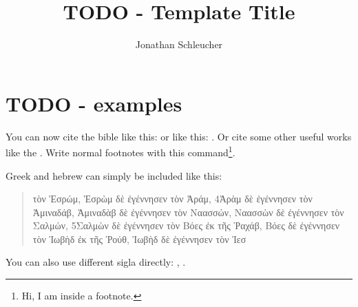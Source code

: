 \documentclass[12pt]{article}
\title{TODO - Template Title}
\date{}
\author{Jonathan Schleucher}
\begin{document}
{\let\newpage\relax\maketitle}

\section{TODO - examples}
You can now cite the bible like this:  or like this: .
Or cite some other useful works like the \Cite{bhs}.
Write normal footnotes with this command\footnote{Hi, I am inside a footnote.}.

Greek and hebrew can simply be included like this:
\begin{quote}
	 τὸν Ἑσρώμ, Ἑσρὼμ δὲ ἐγέννησεν τὸν Ἀράμ, 4Ἀρὰμ δὲ ἐγέννησεν τὸν Ἀμιναδάβ, Ἀμιναδὰβ δὲ ἐγέννησεν τὸν Ναασσών, Ναασσὼν δὲ ἐγέννησεν τὸν Σαλμών, 5Σαλμὼν δὲ ἐγέννησεν τὸν Βόες ἐκ τῆς Ῥαχάβ, Βόες δὲ ἐγέννησεν τὸν Ἰωβὴδ ἐκ τῆς Ῥούθ, Ἰωβὴδ δὲ ἐγέννησεν τὸν Ἰεσ
\end{quote}

You can also use different sigla directly: \MT, \LXX.

\clearpage{\pagestyle{empty}\cleardoublepage}
\break
\renewcommand{\thepage}{}
\printbibliography
\printindex
\end{document}
